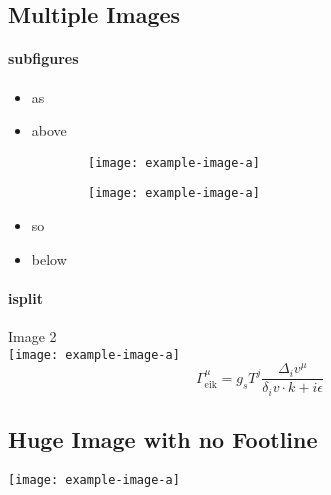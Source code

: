 \subsection{Multiple Images}

\begin{iframe}
    \framesubtitle{subfigures}
	\begin{itemize}
		\item as 
		\item above
	\end{itemize}
	\begin{figure}
		\centering
		\begin{subfigure}[b]{0.49\textwidth}
		    \centering
		     \texttt{[image: example-image-a]}
		\end{subfigure}
		\hfill
		\centering
		\begin{subfigure}[b]{0.49\textwidth}
		    \centering
		     \texttt{[image: example-image-a]}
		\end{subfigure}   
	   \end{figure}
		\begin{itemize}
			\item so
			\item below 
		\end{itemize}
\end{iframe}

\begin{iframe}
\framesubtitle{isplit}
\centering
{}
{
	\centering
	Image 2\\
    \texttt{[image: example-image-a]}
	\begin{equation*}
		\Gamma^\mu_\text{eik} = g_s T^j \frac{\Delta_i v^\mu}{\delta_i v \cdot k + i \epsilon}
	\end{equation*}
}
\end{iframe}

\begingroup
{}
\subsection{Huge Image with no Footline}
\begin{iframe}
    \centering
    \texttt{[image: example-image-a]}
\end{iframe}
\endgroup
